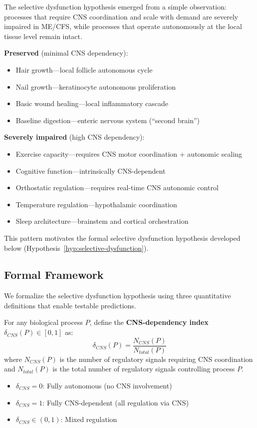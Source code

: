 The selective dysfunction hypothesis emerged from a simple observation: processes that require CNS coordination and scale with demand are severely impaired in ME/CFS, while processes that operate autonomously at the local tissue level remain intact.

\begin{keypoint}
\textbf{Preserved} (minimal CNS dependency):
\begin{itemize}
    \item Hair growth---local follicle autonomous cycle
    \item Nail growth---keratinocyte autonomous proliferation
    \item Basic wound healing---local inflammatory cascade
    \item Baseline digestion---enteric nervous system (``second brain'')
\end{itemize}

\textbf{Severely impaired} (high CNS dependency):
\begin{itemize}
    \item Exercise capacity---requires CNS motor coordination + autonomic scaling
    \item Cognitive function---intrinsically CNS-dependent
    \item Orthostatic regulation---requires real-time CNS autonomic control
    \item Temperature regulation---hypothalamic coordination
    \item Sleep architecture---brainstem and cortical orchestration
\end{itemize}
\end{keypoint}

This pattern motivates the formal selective dysfunction hypothesis developed below (Hypothesis~\ref{hyp:selective-dysfunction}).


\subsection{Formal Framework}

We formalize the selective dysfunction hypothesis using three quantitative definitions that enable testable predictions.

\begin{definition}
\label{def:cns-dependency}
For any biological process $P$, define the \textbf{CNS-dependency index} $\delta_{CNS}(P) \in [0,1]$ as:
\[
\delta_{CNS}(P) = \frac{N_{CNS}(P)}{N_{total}(P)}
\]
where $N_{CNS}(P)$ is the number of regulatory signals requiring CNS coordination and $N_{total}(P)$ is the total number of regulatory signals controlling process $P$.

\begin{itemize}
    \item $\delta_{CNS} = 0$: Fully autonomous (no CNS involvement)
    \item $\delta_{CNS} = 1$: Fully CNS-dependent (all regulation via CNS)
    \item $\delta_{CNS} \in (0,1)$: Mixed regulation
\end{itemize}
\end{definition}

